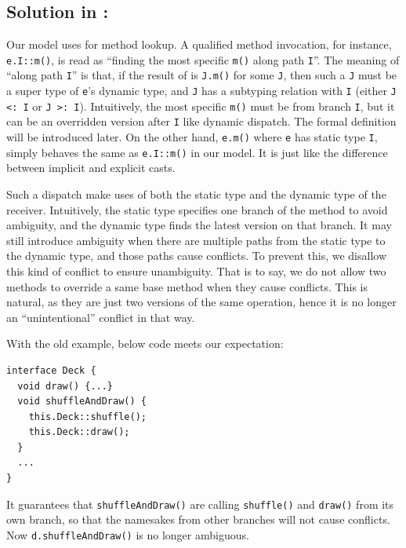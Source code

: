 \subsection{Solution in \MIM: \dispatchnamecaptical}
Our \MIM{} model uses \dispatchnameit{} for method lookup. A qualified method invocation, for instance, \lstinline|e.I::m()|, is read as ``finding the most specific \lstinline|m()| along path \lstinline|I|''. The meaning of ``along path \lstinline|I|'' is that, if the result of \dispatch{} is \lstinline|J.m()| for some \lstinline|J|, then such a \lstinline|J| must be a super type of \lstinline|e|'s dynamic type, and \lstinline|J| has a subtyping relation with \lstinline|I| (either \lstinline|J <: I| or \lstinline|J >: I|). Intuitively, the most specific \lstinline|m()| must be from branch \lstinline|I|, but it can be an overridden version after \lstinline|I| like dynamic dispatch. The formal definition will be introduced later. On the other hand, \lstinline|e.m()| where \lstinline|e| has static type \lstinline|I|, simply behaves the same as \lstinline|e.I::m()| in our model. It is just like the difference between implicit and explicit casts.

Such a dispatch make uses of both the static type and the dynamic type of the receiver. Intuitively, the static type specifies one branch of the method to avoid ambiguity, and the dynamic type finds the latest version on that branch. It may still introduce ambiguity when there are multiple paths from the static type to the dynamic type, and those paths cause conflicts. To prevent this, we disallow this kind of conflict to ensure unambiguity. That is to say, we do not allow two methods to override a same base method when they cause conflicts. This is natural, as they are just two versions of the same operation, hence it is no longer an ``unintentional'' conflict in that way.

With the old example, below code meets our expectation:
\vspace{3pt}\begin{lstlisting}
interface Deck {
  void draw() {...}
  void shuffleAndDraw() {
    this.Deck::shuffle();
    this.Deck::draw();
  }
  ...
}
\end{lstlisting}\vspace{3pt}
It guarantees that \lstinline|shuffleAndDraw()| are calling \lstinline|shuffle()| and \lstinline|draw()| from its own branch, so that the namesakes
from other branches will not cause conflicts. Now \lstinline|d.shuffleAndDraw()| is no longer ambiguous.

